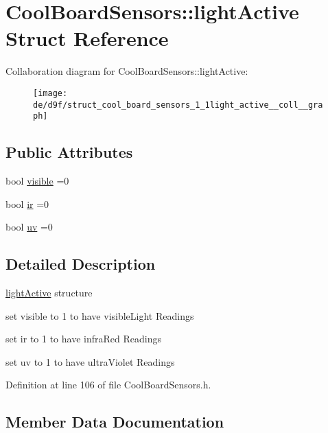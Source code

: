 \hypertarget{struct_cool_board_sensors_1_1light_active}{}\section{Cool\+Board\+Sensors\+:\+:light\+Active Struct Reference}
\label{struct_cool_board_sensors_1_1light_active}


Collaboration diagram for Cool\+Board\+Sensors\+:\+:light\+Active\+:\nopagebreak
\begin{figure}[H]
\begin{center}
\leavevmode
\texttt{[image: de/d9f/struct\_cool\_board\_sensors\_1\_1light\_active\_\_coll\_\_graph]}
\end{center}
\end{figure}
\subsection*{Public Attributes}
\begin{DoxyCompactItemize}
\item 
bool \hyperlink{struct_cool_board_sensors_1_1light_active_a9c351100969d0dc055ad2e6712cc7ac8}{visible} =0
\item 
bool \hyperlink{struct_cool_board_sensors_1_1light_active_a4c21258d3c89c6292740d6deb10f9dcc}{ir} =0
\item 
bool \hyperlink{struct_cool_board_sensors_1_1light_active_a0e6cfc311425a31f32c32fc3b834ffb8}{uv} =0
\end{DoxyCompactItemize}


\subsection{Detailed Description}
\hyperlink{struct_cool_board_sensors_1_1light_active}{light\+Active} structure

set visible to 1 to have visible\+Light Readings

set ir to 1 to have infra\+Red Readings

set uv to 1 to have ultra\+Violet Readings 

Definition at line 106 of file Cool\+Board\+Sensors.\+h.



\subsection{Member Data Documentation}
\mbox{\label{struct_cool_board_sensors_1_1light_active_a4c21258d3c89c6292740d6deb10f9dcc}} 
